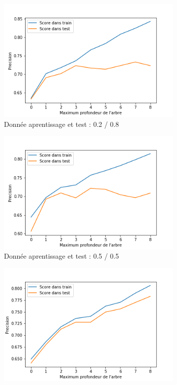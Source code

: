 \documentclass[a4paper,12pt]{article}
\begin{document}
\begin{figure}[h!]
\caption{Score d'arbre de decision en faisant varier le profondeur}
\label{fig:tme1_scores}
\begin{subfigure}{.5\textwidth}
	\centering
	\label{fig:partition_2_8}
	\includegraphics[width=0.8\linewidth]{images/tme1/partition_2_8.png}
	\caption{Donnée aprentissage et test : 0.2 / 0.8}
\end{subfigure}%
\begin{subfigure}{.5\textwidth}
  \centering
	\label{fig:partition_5_5}
	\includegraphics[width=0.8\linewidth]{images/tme1/partition_5_5.png}
	\caption{Donnée aprentissage et test : 0.5 / 0.5}
\end{subfigure}
\begin{subfigure}{.5\textwidth}
  \centering
	\label{fig:partition_8_2}
	\includegraphics[width=0.8\linewidth]{images/tme1/partition_8_2.png}

\end{subfigure}
\end{figure}
\end{document}
